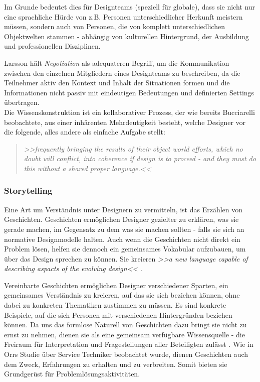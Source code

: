Im Grunde bedeutet dies für Designteams (speziell für globale), dass sie nicht nur eine sprachliche Hürde von z.B. Personen unterschiedlicher Herkunft meistern müssen, sondern auch von Personen, die von komplett unterschiedlichen Objektwelten stammen - abhängig von kulturellen Hintergrund, der Ausbildung und professionellen Disziplinen.

\medskip Larsson hält \emph{Negotiation} als adequateren Begriff, um die Kommunikation zwischen den einzelnen Mitgliedern eines Designteams zu beschreiben, da die Teilnehmer aktiv den Kontext und Inhalt der Situationen formen und die Informationen nicht passiv mit eindeutigen Bedeutungen und definierten Settings übertragen. \citep{Larsson:2003} \\
Die Wissenskonstruktion ist ein kollaborativer Prozess, der wie bereits Bucciarelli beobachtete, aus einer inhärenten Mehrdeutigkeit besteht, welche Designer vor die folgende, alles andere als einfache Aufgabe stellt: 

\begin{quote}
	\textsl{>>frequently bringing the results of their object world efforts, which no doubt will conflict, into coherence if design is to proceed - and they must do this without a shared proper language.<<}
\begin{flushright}\citep{Bucciarelli:2002}\end{flushright}
\end{quote}

\subsubsection{Storytelling}
Eine Art um Verständnis unter Designern zu vermitteln, ist das Erzählen von Geschichten. Geschichten ermöglichen Designer gezielter zu erklären, was sie gerade machen, im Gegensatz zu dem was sie machen sollten - falls sie sich an normative Designmodelle halten. Auch wenn die Geschichten nicht direkt ein Problem lösen, helfen sie dennoch ein gemeinsames Vokabular aufzubauen, um über das Design sprechen zu können. Sie kreieren \emph{>>a new language capable of describing aspacts of the evolving design<<} \citep{Lloyd:2000}.

\medskip Vereinbarte Geschichten ermöglichen Designer verschiedener Sparten, ein gemeinsames Verständnis zu kreieren, auf das sie sich beziehen können, ohne dabei zu konkreten Thematiken zustimmen zu müssen. Es sind konkrete Beispiele, auf die sich Personen mit verschiedenen Hintergründen beziehen können. Da uns das formlose Naturell von Geschichten dazu bringt sie nicht zu ernst zu nehmen, dienen sie als eine gemeinsam verfügbare Wissensquelle - die Freiraum für Interpretation und Fragestellungen aller Beteiligten zulässt \citep{Erickson:1996}. Wie in Orrs Studie über Service Techniker \citep{Orr:1986} beobachtet wurde, dienen Geschichten auch dem Zweck, Erfahrungen zu erhalten und zu verbreiten. Somit bieten sie Grundgerüst für Problemlösungsaktivitäten.

